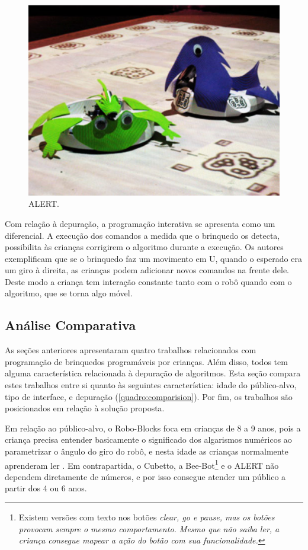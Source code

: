 \begin{figure}[!h]
    \centering
    \includegraphics[width=.6\linewidth,fbox]{figs/alert.png}
    \caption{ALERT.}
    \label{fig:alert}
\end{figure}

Com relação à depuração, a programação interativa se apresenta como um diferencial. A execução dos comandos a medida que o brinquedo os detecta, possibilita às crianças corrigirem o algoritmo durante a execução. Os autores exemplificam que se o brinquedo faz um movimento em U, quando o esperado era um giro à direita, as crianças podem adicionar novos comandos na frente dele. Deste modo a criança tem interação constante tanto com o robô quando com o algoritmo, que se torna algo móvel. 

\subsection{Análise Comparativa}

As seções anteriores apresentaram quatro trabalhos relacionados com programação de brinquedos programáveis por crianças. Além disso, todos tem alguma característica relacionada à depuração de algoritmos. Esta seção compara estes trabalhos entre si quanto às seguintes característica: idade do público-alvo, tipo de interface, e depuração (\autoref{quadro:comparision}). Por fim, os trabalhos são posicionados em relação à solução proposta.

Em relação ao público-alvo, o Robo-Blocks foca em crianças de 8 a 9 anos, pois a criança precisa entender basicamente o significado dos algarismos numéricos ao parametrizar o ângulo do giro do robô, e nesta idade as crianças normalmente aprenderam ler \cite{committee_on_the_prevention_of_reading_difficulties_in_young_children_preventing_1998}. Em contrapartida, o Cubetto, a Bee-Bot\footnote{Existem versões com texto nos botões \it{clear}, \it{go} e \it{pause}, mas os botões provocam sempre o mesmo comportamento. Mesmo que não saiba ler, a criança consegue mapear a ação do botão com sua funcionalidade.} e o ALERT não dependem diretamente de números, e por isso consegue atender um público a partir dos 4 ou 6 anos.

